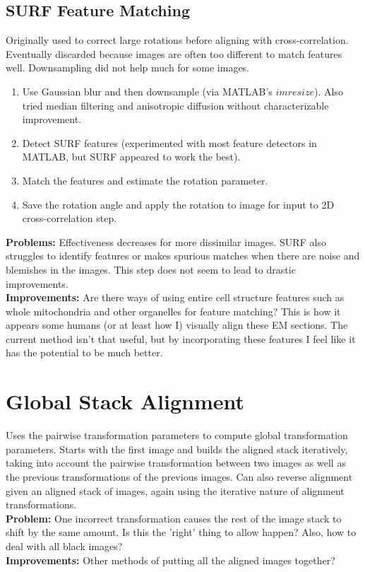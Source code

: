 \documentclass{article}
\begin{document}
\subsection{SURF Feature Matching}
Originally used to correct large rotations before aligning with cross-correlation. Eventually discarded because images are often too different to match features well. Downsampling did not help much for some images.\\
\begin{enumerate}
\item Use Gaussian blur and then downsample (via MATLAB's $imresize$). Also tried median filtering and anisotropic diffusion without characterizable improvement.
\item Detect SURF features (experimented with most feature detectors in MATLAB, but SURF appeared to work the best). 
\item Match the features and estimate the rotation parameter.
\item Save the rotation angle and apply the rotation to image for input to 2D cross-correlation step.
\end{enumerate}
\textbf{Problems:} Effectiveness decreases for more dissimilar images. SURF also struggles to identify features or makes spurious matches when there are noise and blemishes in the images. This step does not seem to lead to drastic improvements. \\
\textbf{Improvements:} Are there ways of using entire cell structure features such as whole mitochondria and other organelles for feature matching? This is how it appears some humans (or at least how I) visually align these EM sections. The current method isn't that useful, but by incorporating these features I feel like it has the potential to be much better.

\section{Global Stack Alignment}
Uses the pairwise transformation parameters to compute global transformation parameters. Starts with the first image and builds the aligned stack iteratively, taking into account the pairwise transformation between two images as well as the previous transformations of the previous images. Can also reverse alignment given an aligned stack of images, again using the iterative nature of alignment transformations. \\
\textbf{Problem:} One incorrect transformation causes the rest of the image stack to shift by the same amount. Is this the 'right' thing to allow happen? Also, how to deal with all black images? \\
\textbf{Improvements:} Other methods of putting all the aligned images together?
\end{document}
